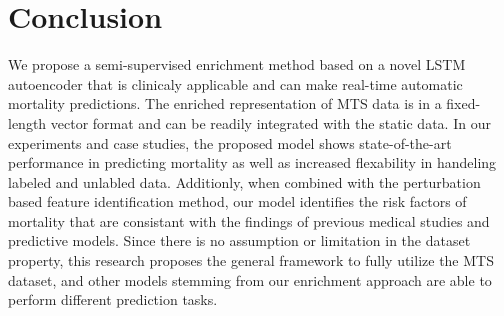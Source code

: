 \iffalse
We proposed models based on LSTMs that can learn good video representations.
First, given that the proposed machine learning method is purely data-driven, our model may vary if starting from different datasets. As more data become available, the whole procedure can easily be repeated to obtain more accurate models.
We does not assume any property about dataset.

In this paper, we considered the identification of COVID-19 cases from X-ray images and proposed a novel semi-supervised deep architecture that can distinguish between the three cases of Healthy, non-COVID pneumonia, COVID-19 infection based on the chest X-ray manifestation of these classes. The proposed methodology is comprised of two modules: 1) the Task-Based Feature Extraction Network (TFEN), and 2) the COVID-19 Identification Network (CIN). 
\fi
\section{Conclusion}
We propose a semi-supervised enrichment method based on a novel LSTM autoencoder that is clinicaly applicable and can make real-time automatic mortality predictions. The enriched representation of MTS data is in a fixed-length vector format and can be readily integrated with the static data. In our experiments and case studies, the proposed model shows state-of-the-art performance in predicting mortality as well as increased flexability in handeling labeled and unlabled data. Additionly, when combined with the perturbation based feature identification method, our model identifies the risk factors of mortality that are consistant with the findings of previous medical studies and predictive models. 
Since there is no assumption or limitation in the dataset property, this research proposes the general framework to fully utilize the MTS dataset, and other models stemming from our enrichment approach are able to perform different prediction tasks.
\clearpage